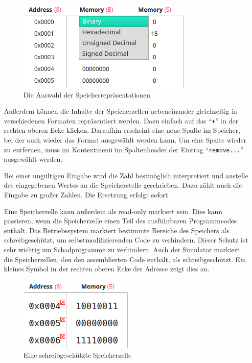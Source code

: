 \begin{figure}[ht]
	\centering
  \includegraphics[scale=1]{Images/Memory_Representation}
	\caption{Die Auswahl der Speicherrepräsentationen}
	\label{Memory_Respresentations}
\end{figure}

Außerdem können die Inhalte der Speicherzellen nebeneinander gleichzeitig in
verschiedenen Formaten repräsentiert werden. Dazu einfach auf das ``\texttt{+}''
in der rechten oberen Ecke klicken. Daraufhin erscheint eine neue Spalte im
Speicher, bei der auch wieder das Format ausgewählt werden kann. Um eine Spalte
wieder zu entfernen, muss im Kontextmenü im Spaltenheader der Eintrag
``\texttt{remove...}'' ausgewählt werden.

\begin{warningblock}
Bei einer ungültigen Eingabe wird die Zahl bestmöglich interpretiert und
anstelle des eingegebenen Wertes an die Speicherstelle geschrieben. Dazu zählt
auch die Eingabe zu großer Zahlen. Die Ersetzung erfolgt sofort.
\end{warningblock}

Eine Speicherzelle kann außerdem als read-only markiert sein.
Dies kann passieren, wenn die Speicherzelle einen Teil des ausführbaren
Programmcodes enthält.
Das Betriebssystem markiert bestimmte Bereiche des Speichers als
schreibgeschützt, um selbstmodifizierenden Code zu verhindern.
Dieser Schutz ist sehr wichtig um Schadprogramme zu verhindern.
Auch der Simulator markiert die Speicherzellen, den den assemblierten Code
enthält, als schreibgeschützt. Ein kleines Symbol in der rechten oberen Ecke
der Adresse zeigt dies an.

\begin{figure}[ht]
	\centering
  \includegraphics[scale=1]{Images/Memory_writeprotected}
	\caption{Eine schreibgeschützte Speicherzelle}
	\label{Memory_writeprotected}
\end{figure}



